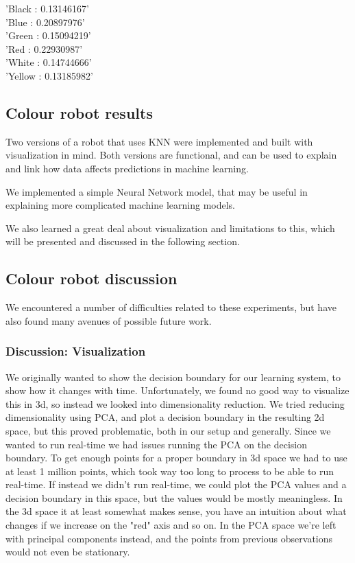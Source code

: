 \documentclass[11pt, a4paper]{article}
\begin{document}
'Black : 0.13146167' \\

'Blue : 0.20897976' \\

'Green : 0.15094219' \\

'Red : 0.22930987' \\

'White : 0.14744666' \\

'Yellow : 0.13185982' 

\subsection{Colour robot results}
Two versions of a robot that uses KNN were implemented and built with visualization in mind. Both versions are functional, and can be used to explain and link how data affects predictions in machine learning.

We implemented a simple Neural Network model, that may be useful in explaining more complicated machine learning models.

We also learned a great deal about visualization and limitations to this, which will be presented and discussed in the following section.
\subsection{Colour robot discussion}
We encountered a number of difficulties related to these experiments, but have also found many avenues of possible future work.
\subsubsection{Discussion: Visualization}
We originally wanted to show the decision boundary for our learning system, to show how it changes with time. Unfortunately, we found no good way to visualize this in 3d, so instead we looked into dimensionality reduction. We tried reducing dimensionality using PCA, and plot a decision boundary in the resulting 2d space, but this proved problematic, both in our setup and generally. Since we wanted to run real-time we had issues running the PCA on the decision boundary. To get enough points for a proper boundary in 3d space we had to use at least 1 million points, which took way too long to process to be able to run real-time. If instead we didn't run real-time, we could plot the PCA values and a decision boundary in this space, but the values would be mostly meaningless. In the 3d space it at least somewhat makes sense, you have an intuition about what changes if we increase on the "red" axis and so on. In the PCA space we're left with principal components instead, and the points from previous observations would not even be stationary.
\end{document}
